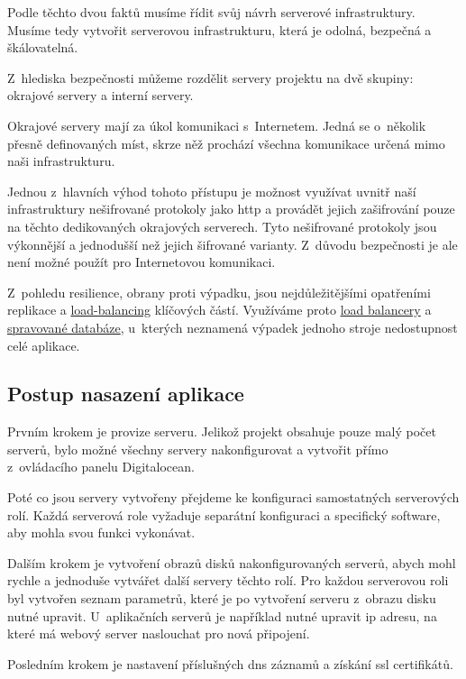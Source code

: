 \emptyLine

Podle těchto dvou faktů musíme řídit svůj návrh serverové infrastruktury.  Musíme tedy vytvořit serverovou infrastrukturu, která je odolná, bezpečná a škálovatelná.

Z~hlediska bezpečnosti můžeme rozdělit servery projektu \bso na dvě skupiny: okrajové servery a interní servery.

Okrajové servery mají za úkol komunikaci s~Internetem. Jedná se o~několik přesně definovaných míst, skrze něž prochází všechna komunikace určená mimo naši infrastrukturu.

Jednou z~hlavních výhod tohoto přístupu je možnost využívat uvnitř naší infrastruktury nešifrované protokoly jako \acrshort{http} a provádět jejich zašifrování pouze na těchto dedikovaných okrajových serverech. Tyto nešifrované protokoly jsou výkonnější a jednodušší než jejich šifrované varianty\cite{http-faster-https}. Z~důvodu bezpečnosti je ale není možné použít pro Internetovou komunikaci.

Z~pohledu resilience, obrany proti výpadku, jsou nejdůležitějšími opatřeními replikace a \hyperref[sub:load-balancing]{load-balancing} klíčových částí. Využíváme proto \hyperref[sub:load-balancing]{load balancery} a \hyperref[subsub:managed-databases]{spravované databáze}, u~kterých neznamená výpadek jednoho stroje nedostupnost celé aplikace.


\subsection{Postup nasazení aplikace}
\label{sub:deployment}

Prvním krokem je provize serveru. Jelikož projekt \bso obsahuje pouze malý počet serverů, bylo možné všechny servery nakonfigurovat a vytvořit přímo z~ovládacího panelu Digitalocean.

Poté co jsou servery vytvořeny přejdeme ke konfiguraci samostatných serverových rolí. Každá serverová role vyžaduje separátní konfiguraci a specifický software, aby mohla svou funkci vykonávat.

Dalším krokem je vytvoření obrazů disků nakonfigurovaných serverů, abych mohl rychle a jednoduše vytvářet další servery těchto rolí. Pro každou serverovou roli byl vytvořen seznam parametrů, které je po vytvoření serveru z~obrazu disku nutné upravit. U~aplikačních serverů je například nutné upravit \acrshort{ip} adresu, na které má webový server naslouchat pro nová připojení. 

Posledním krokem je nastavení příslušných \acrshort{dns} záznamů a získání \acrshort{ssl} certifikátů.

